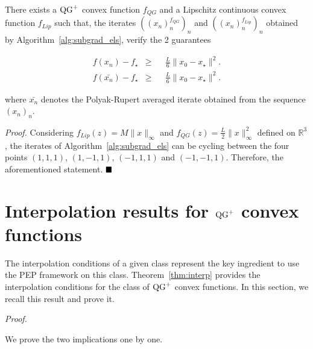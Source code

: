     \begin{Th}
        There exists a $\operatorname{QG}^+$ convex function $f_{QG}$ and a Lipschitz continuous convex function $f_{Lip}$ such that, the iterates $((x_n)_n^{f_{QG}})_n$ and $((x_n)_n^{f_{Lip}})_n$ obtained by Algorithm~\ref{alg:subgrad_els}, verify the 2 guarantees
        
        \begin{align}
            f(x_n) - f_\star & \geq && \frac{L}{6} \|x_0 - x_\star\|^2. \\
            f(\bar{x_n}) - f_\star & \geq && \frac{L}{6} \|x_0 - x_\star\|^2.
        \end{align}
        
        where $\bar{x_n}$ denotes the Polyak-Rupert averaged iterate obtained from the sequence $(x_n)_n$.
        
        \label{thm:gd_els_lower_bound}
    \end{Th}

    \noindent \textit{Proof.}
        Considering $f_{Lip}(z) = M\|x\|_\infty$ and $f_{QG}(z) = \frac{L}{2}\|x\|_\infty^2$ defined on $\mathbb{R}^3$,
        the iterates of Algorithm~\ref{alg:subgrad_els} can be cycling between the four points $(1,1,1)$, $(1,-1,1)$, $(-1,1,1)$ and $(-1,-1,1)$.
        Therefore, the aforementioned statement.
    $\hfill\blacksquare$
    
\vspace{.5cm}

\section{\texorpdfstring{Interpolation results for $\operatorname{QG}^+$ convex functions}{Interpolation results for QG+ convex functions}}
\label{apx:interpolation_conditions}

    The interpolation conditions of a given class represent the key ingredient to use the PEP framework on this class.
    Theorem~\ref{thm:interp} provides the interpolation conditions for the class of $\operatorname{QG}^+$ convex functions.
    In this section, we recall this result and prove it.

    \interpolationconditions*

    \noindent \textit{Proof.}

        We prove the two implications one by one.

